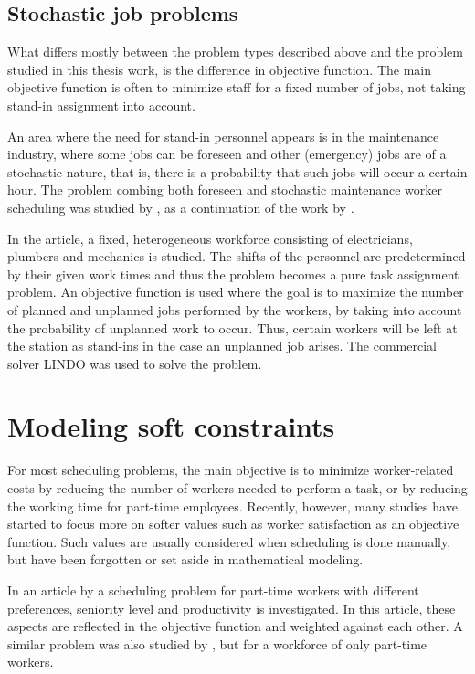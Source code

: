 \subsection{Stochastic job problems}
What differs mostly between the problem types described above and the problem studied in this thesis work, is the difference in objective function. The main objective function is often to minimize staff for a fixed number of jobs, not taking stand-in assignment into account.

An area where the need for stand-in personnel appears is in the  maintenance industry, where some jobs can be foreseen and other (emergency) jobs are of a stochastic nature, that is, there is a probability that such jobs will occur a certain hour. The problem combing both foreseen and stochastic maintenance worker scheduling was studied by \citet{duffuaa_1999}, as a continuation of the work by \citet{roberts_1983}. 

In the article, a fixed, heterogeneous workforce consisting of electricians, plumbers and mechanics is studied. The shifts of the personnel are predetermined by their given work times and thus the problem becomes a pure task assignment problem. An objective function is used where the goal is to maximize the number of planned and unplanned jobs performed by the workers, by taking into account the probability of unplanned work to occur. Thus, certain workers will be left at the station as stand-ins in the case an unplanned job arises. The commercial solver LINDO was used to solve the problem.


\section{Modeling soft constraints} \label{WLA}
For most scheduling problems, the main objective is to minimize worker-related costs by reducing the number of workers needed to perform a task, or by reducing the working time for part-time employees. Recently, however, many studies have started to focus more on softer values such as worker satisfaction as an objective function. Such values are usually considered when scheduling is done manually, but have been forgotten or set aside in mathematical modeling.

 In an article by \citet{akbari_2013} a scheduling problem for part-time workers with different preferences, seniority level and productivity is investigated. In this article, these aspects are reflected in the objective function and weighted against each other. A similar problem was also studied by \citet{mohan_2008}, but for a workforce of only part-time workers. %

